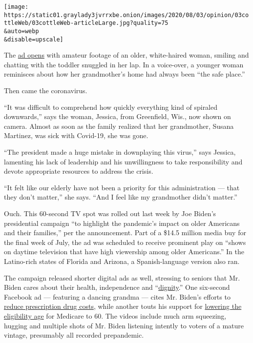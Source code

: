 \texttt{[image: https://static01.graylady3jvrrxbe.onion/images/2020/08/03/opinion/03cottleWeb/03cottleWeb-articleLarge.jpg?quality=75\\\&auto=webp\\\&disable=upscale]}

The
\href{https://www.youtube.com/watch?v=FxT0IFdaaQc\&feature=youtu.be}{ad
opens} with amateur footage of an older, white-haired woman, smiling and
chatting with the toddler snuggled in her lap. In a voice-over, a
younger woman reminisces about how her grandmother's home had always
been ``the safe place.''

Then came the coronavirus.

``It was difficult to comprehend how quickly everything kind of spiraled
downwards,'' says the woman, Jessica, from Greenfield, Wis., now shown
on camera. Almost as soon as the family realized that her grandmother,
Susana Martinez, was sick with Covid-19, she was gone.

``The president made a huge mistake in downplaying this virus,'' says
Jessica, lamenting his lack of leadership and his unwillingness to take
responsibility and devote appropriate resources to address the crisis.

``It felt like our elderly have not been a priority for this
administration --- that they don't matter,'' she says. ``And I feel like
my grandmother didn't matter.''

Ouch. This 60-second TV spot was rolled out last week by Joe Biden's
presidential campaign ``to highlight the pandemic's impact on older
Americans and their families,'' per the announcement. Part of a \$14.5
million media buy for the final week of July, the ad was scheduled to
receive prominent play on ``shows on daytime television that have high
viewership among older Americans.'' In the Latino-rich states of Florida
and Arizona, a Spanish-language version also ran.

The campaign released shorter digital ads as well, stressing to seniors
that Mr. Biden cares about their health, independence and
``\href{https://www.youtube.com/watch?v=8ex_yXPnXJU\&feature=youtu.be}{dignity}.''
One six-second Facebook ad --- featuring a dancing grandma --- cites Mr.
Biden's efforts to
\href{https://www.youtube.com/watch?v=fPisAy6jSXo\&feature=youtu.be}{reduce
prescription drug costs}, while another touts his support for
\href{https://www.youtube.com/watch?v=GafRKUdo1xI\&feature=youtu.be}{lowering
the eligibility age} for Medicare to 60. The videos include much arm
squeezing, hugging and multiple shots of Mr. Biden listening intently to
voters of a mature vintage, presumably all recorded prepandemic.

